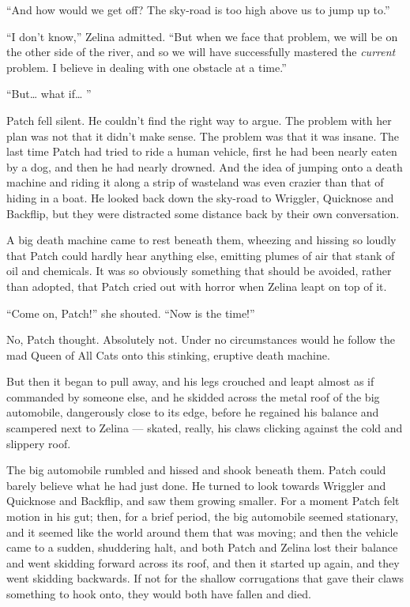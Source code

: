 \documentclass[ebook,oneside,openany,17pt]{memoir}
\begin{document}
“And how would we get off? The sky-road is too high above us to jump
up to.”

“I don’t know,” Zelina admitted. “But when we face that problem, we
will be on the other side of the river, and so we will have
successfully mastered the \emph{current} problem. I believe in
dealing with one obstacle at a time.”

“But… what if… ”

Patch fell silent. He couldn’t find the right way to argue. The
problem with her plan was not that it didn’t make sense. The problem
was that it was insane. The last time Patch had tried to ride a human
vehicle, first he had been nearly eaten by a dog, and then he had
nearly drowned. And the idea of jumping onto a death machine and
riding it along a strip of wasteland was even crazier than that of
hiding in a boat. He looked back down the sky-road to Wriggler,
Quicknose and Backflip, but they were distracted some distance back by
their own conversation.

A big death machine came to rest beneath them, wheezing and hissing so
loudly that Patch could hardly hear anything else, emitting plumes of
air that stank of oil and chemicals. It was so obviously something
that should be avoided, rather than adopted, that Patch cried out with
horror when Zelina leapt on top of it.

“Come on, Patch!” she shouted. “Now is the time!”

No, Patch thought. Absolutely not. Under no circumstances would he
follow the mad Queen of All Cats onto this stinking, eruptive death
machine.

But then it began to pull away, and his legs crouched and leapt almost
as if commanded by someone else, and he skidded across the metal roof
of the big automobile, dangerously close to its edge, before he
regained his balance and scampered next to Zelina — skated, really,
his claws clicking against the cold and slippery roof.

The big automobile rumbled and hissed and shook beneath them. Patch
could barely believe what he had just done. He turned to look towards
Wriggler and Quicknose and Backflip, and saw them growing smaller. For
a moment Patch felt motion in his gut; then, for a brief period, the
big automobile seemed stationary, and it seemed like the world around
them that was moving; and then the vehicle came to a sudden,
shuddering halt, and both Patch and Zelina lost their balance and went
skidding forward across its roof, and then it started up again, and
they went skidding backwards. If not for the shallow corrugations that
gave their claws something to hook onto, they would both have fallen
and died.
\end{document}
